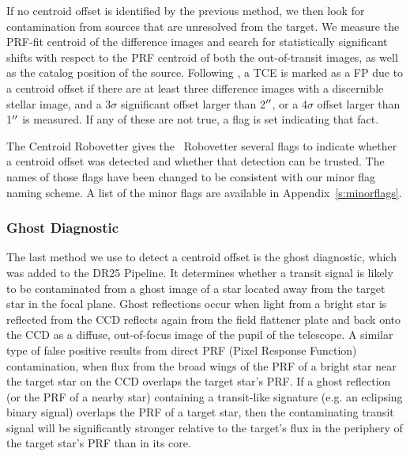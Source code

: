 If no centroid offset is identified by the previous method, we then look for contamination from sources that are unresolved from the target. We measure the PRF-fit centroid of the difference images and search for statistically significant shifts with respect to the PRF centroid of both the out-of-transit images, as well as the catalog position of the source. Following \citet{Bryson2013}, a TCE is marked as a FP due to a centroid offset if there are at least three difference images with a discernible stellar image, and a 3$\sigma$ significant offset larger than 2$\mbox{$^{\prime\prime}$}$, or a 4$\sigma$ offset larger than 1$\mbox{$^{\prime\prime}$}$ is measured.  If any of these are not true, a flag is set indicating that fact.

The Centroid Robovetter gives the \kepler\ Robovetter several flags to indicate whether a centroid offset was detected and whether that detection can be trusted. The names of those flags have been changed to be consistent with our minor flag naming scheme. A list of the minor flags are available in Appendix~\ref{s:minorflags}.


\subsubsection{Ghost Diagnostic}
\label{s:ghost}
The last method we use to detect a centroid offset is the ghost diagnostic, which was added to the DR25 \kepler{} Pipeline. It determines whether a transit signal is likely to be contaminated from a ghost image of a star located away from the target star in the focal plane. Ghost reflections occur when light from a bright star is reflected from the CCD reflects again from the field flattener plate and back onto the CCD as a diffuse, out-of-focus image of the pupil of
the telescope. A similar type of false positive results from direct PRF (Pixel Response Function) contamination, when flux from the broad wings of the PRF of a bright star near the target star on the CCD overlaps the target star's PRF.  If a ghost reflection (or the PRF of a nearby star) containing a transit-like signature (e.g. an eclipsing binary signal) overlaps the PRF of a target star, then the contaminating transit signal will be significantly stronger relative to the target's flux in the periphery of the target star's PRF than in its core.

